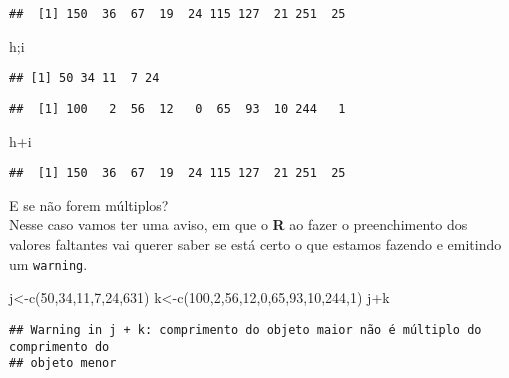 \documentclass[
]{book}
\newenvironment{Shaded}{\begin{snugshade}}{\end{snugshade}}
\newcommand{\DecValTok}[1]{\textcolor[rgb]{0.00,0.00,0.81}{#1}}
\newcommand{\FunctionTok}[1]{\textcolor[rgb]{0.00,0.00,0.00}{#1}}
\newcommand{\NormalTok}[1]{#1}
\newcommand{\OtherTok}[1]{\textcolor[rgb]{0.56,0.35,0.01}{#1}}
\newcommand{\SpecialCharTok}[1]{\textcolor[rgb]{0.00,0.00,0.00}{#1}}
\begin{document}
\begin{verbatim}
##  [1] 150  36  67  19  24 115 127  21 251  25
\end{verbatim}

\begin{Shaded}
\begin{Highlighting}[]
\NormalTok{h;i}
\end{Highlighting}
\end{Shaded}

\begin{verbatim}
## [1] 50 34 11  7 24
\end{verbatim}

\begin{verbatim}
##  [1] 100   2  56  12   0  65  93  10 244   1
\end{verbatim}

\begin{Shaded}
\begin{Highlighting}[]
\NormalTok{h}\SpecialCharTok{+}\NormalTok{i}
\end{Highlighting}
\end{Shaded}

\begin{verbatim}
##  [1] 150  36  67  19  24 115 127  21 251  25
\end{verbatim}

E se não forem múltiplos?\\
Nesse caso vamos ter uma aviso, em que o \textbf{R} ao fazer o preenchimento dos valores faltantes vai querer saber se está certo o que estamos fazendo e emitindo um \texttt{warning}.

\begin{Shaded}
\begin{Highlighting}[]
\NormalTok{j}\OtherTok{\textless{}{-}}\FunctionTok{c}\NormalTok{(}\DecValTok{50}\NormalTok{,}\DecValTok{34}\NormalTok{,}\DecValTok{11}\NormalTok{,}\DecValTok{7}\NormalTok{,}\DecValTok{24}\NormalTok{,}\DecValTok{631}\NormalTok{)}
\NormalTok{k}\OtherTok{\textless{}{-}}\FunctionTok{c}\NormalTok{(}\DecValTok{100}\NormalTok{,}\DecValTok{2}\NormalTok{,}\DecValTok{56}\NormalTok{,}\DecValTok{12}\NormalTok{,}\DecValTok{0}\NormalTok{,}\DecValTok{65}\NormalTok{,}\DecValTok{93}\NormalTok{,}\DecValTok{10}\NormalTok{,}\DecValTok{244}\NormalTok{,}\DecValTok{1}\NormalTok{)}
\NormalTok{j}\SpecialCharTok{+}\NormalTok{k}
\end{Highlighting}
\end{Shaded}

\begin{verbatim}
## Warning in j + k: comprimento do objeto maior não é múltiplo do comprimento do
## objeto menor
\end{verbatim}
\end{document}
